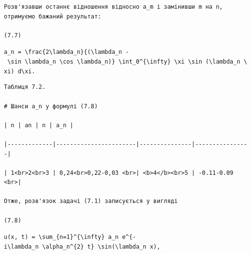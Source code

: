 \documentclass[
  ukrainian,
]{article}
\begin{document}
\begin{verbatim}
Розв'язавши останнє відношення відносно a_m і замінивши m на n, отримуємо бажаний результат:

(7.7)
\end{verbatim}

\texttt{a\_n\ =\ \textbackslash{}frac\{2\textbackslash{}lambda\_n\}\{(\textbackslash{}lambda\_n\ -\ \textbackslash{}sin\ \textbackslash{}lambda\_n\ \textbackslash{}cos\ \textbackslash{}lambda\_n)\}\ \textbackslash{}int\_0\^{}\{\textbackslash{}infty\}\ \textbackslash{}xi\ \textbackslash{}sin\ (\textbackslash{}lambda\_n\ \textbackslash{}xi)\ d\textbackslash{}xi.}

\begin{verbatim}
Таблиця 7.2.

# Шанси a_n у формулі (7.8)

| n | an | n | a_n |

|-------------|-----------------------|---------------|----------------|

| 1<br>2<br>3 | 0,24<br>0,22-0,03 <br>| <b>4</b><br>5 | -0.11-0.09 <br>|

Отже, розв'язок задачі (7.1) записується у вигляді

(7.8)
\end{verbatim}

\texttt{u(x,\ t)\ =\ \textbackslash{}sum\_\{n=1\}\^{}\{\textbackslash{}infty\}\ a\_n\ e\^{}\{-i\textbackslash{}lambda\_n\ \textbackslash{}alpha\_n\^{}\{2\}\ t\}\ \textbackslash{}sin(\textbackslash{}lambda\_n\ x),}
\end{document}
